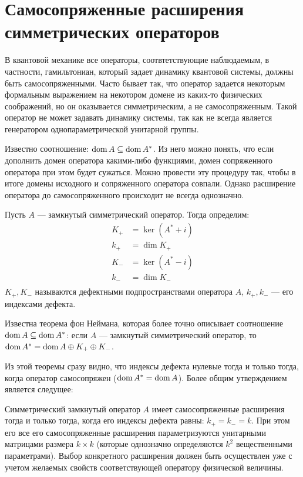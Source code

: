\section{Самосопряженные расширения симметрических операторов}
В квантовой механике все операторы, соотвтетствующие наблюдаемым, в частности, гамильтониан, который задает динамику квантовой системы, должны быть самосопряженными. Часто бывает так, что оператор задается некоторым формальным выражением на некотором домене из каких-то физических соображений, но он оказывается симметрическим, а не самосопряженным. Такой оператор не может задавать динамику системы, так как не всегда является генератором однопараметрической унитарной группы.

Известно соотношение: $\operatorname{dom} A \subseteq \operatorname{dom} A^*$. Из него можно понять, что если дополнить домен оператора какими-либо функциями, домен сопряженного оператора при этом будет сужаться. Можно провести эту процедуру так, чтобы в итоге домены исходного и сопряженного оператора совпали. Однако расширение оператора до самосопряженного происходит не всегда однозначно.

Пусть $A$ — замкнутый симметрический оператор. Тогда определим:
\begin{align*}
K_+ &= \ker (A^* + i) \\
k_+ &= \dim K_+ \\
K_- &= \ker (A^* - i) \\
k_- &= \dim K_- \\
\end{align*}
$K_+, K_-$ называются дефектными подпространствами оператора $A$, $k_+, k_-$ — его индексами дефекта.

Известна теорема фон Неймана, которая более точно описывает соотношение $\operatorname{dom} A \subseteq \operatorname{dom} A^*$: если $A$ — замкнутый симметрический оператор, то $\operatorname{dom} A^* = \operatorname{dom} A \oplus K_+ \oplus K_-$.

Из этой теоремы сразу видно, что индексы дефекта нулевые тогда и только тогда, когда оператор самосопряжен ($\operatorname{dom} A^* = \operatorname{dom} A$). Более общим утверждением является следущее:

Симметрический замкнутый оператор $A$ имеет самосопряженные расширения тогда и только тогда, когда его индексы дефекта равны: $k_+ = k_- = k$. При этом его все его самосопряженные расширения параметризуются унитарными матрицами размера $k \times k$ (которые однозначно определяются $k^2$ вещественными параметрами). Выбор конкретного расширения должен быть осуществлен уже с учетом желаемых свойств соответствующей оператору физической величины.

